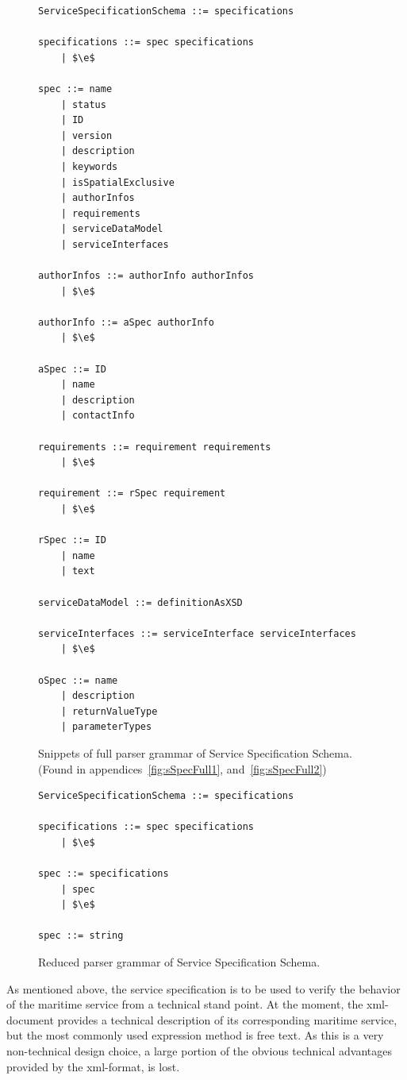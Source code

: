 \begin{figure}
  \centering
  \begin{lstlisting}[keywordstyle={}]
ServiceSpecificationSchema ::= specifications

specifications ::= spec specifications
    | $\e$
     
spec ::= name
    | status
    | ID
    | version
    | description
    | keywords
    | isSpatialExclusive
    | authorInfos
    | requirements
    | serviceDataModel
    | serviceInterfaces
     
authorInfos ::= authorInfo authorInfos
    | $\e$

authorInfo ::= aSpec authorInfo
    | $\e$

aSpec ::= ID
    | name
    | description
    | contactInfo

requirements ::= requirement requirements
    | $\e$

requirement ::= rSpec requirement
    | $\e$

rSpec ::= ID
    | name
    | text

serviceDataModel ::= definitionAsXSD

serviceInterfaces ::= serviceInterface serviceInterfaces
    | $\e$

oSpec ::= name
    | description
    | returnValueType
    | parameterTypes
  \end{lstlisting}
  \caption{Snippets of full parser grammar of Service Specification Schema. (Found in appendices~\ref{fig:sSpecFull1}, and~\ref{fig:sSpecFull2})}
  \label{fig:sSpecFull}
\end{figure}

\begin{figure}
  \centering
  \begin{lstlisting}[keywordstyle={}]
ServiceSpecificationSchema ::= specifications

specifications ::= spec specifications
    | $\e$
     
spec ::= specifications
    | spec
    | $\e$

spec ::= string
  \end{lstlisting}
  \caption{Reduced parser grammar of Service Specification Schema.}
  \label{fig:sSpecRed}
\end{figure}

As mentioned above, the service specification is to be used to verify the behavior of the maritime service from a technical stand point. At the moment, the xml-document provides a technical description of its corresponding maritime service, but the most commonly used expression method is free text. As this is a very non-technical design choice, a large portion of the obvious technical advantages provided by the xml-format, is lost. 

